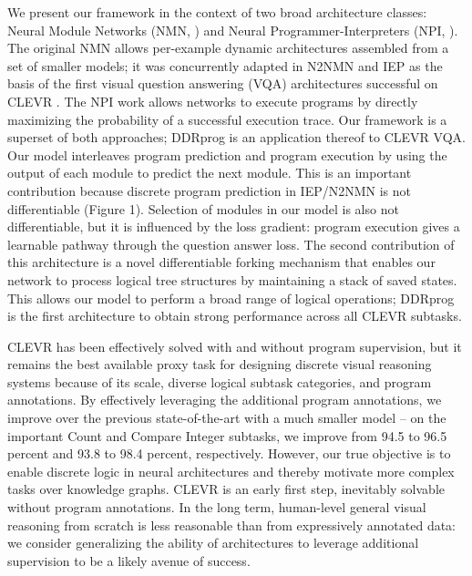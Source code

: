 \documentclass{article}
\begin{document}
We present our framework in the context of two broad architecture classes: Neural Module Networks (NMN, \cite{DBLP:journals/corr/AndreasRDK15}) and Neural Programmer-Interpreters (NPI, \cite{DBLP:journals/corr/ReedF15}). The original NMN allows per-example dynamic architectures assembled from a set of smaller models; it was concurrently adapted in N2NMN \cite{DBLP:journals/corr/HuARDS17} and IEP \cite{DBLP:journals/corr/JohnsonHMHLZG17} as the basis of the first visual question answering (VQA) architectures successful on CLEVR \cite{DBLP:journals/corr/JohnsonHMFZG16}. The NPI work allows networks to execute programs by directly maximizing the probability of a successful execution trace. Our framework is a superset of both approaches; DDRprog is an application thereof to CLEVR VQA. Our model interleaves program prediction and program execution by using the output of each module to predict the next module. This is an important contribution because discrete program prediction in IEP/N2NMN is not differentiable (Figure 1). Selection of modules in our model is also not differentiable, but it is influenced by the loss gradient: program execution gives a learnable pathway through the question answer loss. The second contribution of this architecture is a novel differentiable forking mechanism that enables our network to process logical tree structures by maintaining a stack of saved states. This allows our model to perform a broad range of logical operations; DDRprog is the first architecture to obtain strong performance across all CLEVR subtasks.

CLEVR has been effectively solved with and without program supervision, but it remains the best available proxy task for designing discrete visual reasoning systems because of its scale, diverse logical subtask categories, and program annotations. By effectively leveraging the additional program annotations, we improve over the previous state-of-the-art with a much smaller model  --  on the important Count and Compare Integer subtasks, we improve from 94.5 to 96.5 percent and 93.8 to 98.4 percent, respectively. However, our true objective is to enable discrete logic in neural architectures and thereby motivate more complex tasks over knowledge graphs. CLEVR is an early first step, inevitably solvable without program annotations. In the long term, human-level general visual reasoning from scratch is less reasonable than from expressively annotated data: we consider generalizing the ability of architectures to leverage additional supervision to be a likely avenue of success.
\end{document}
